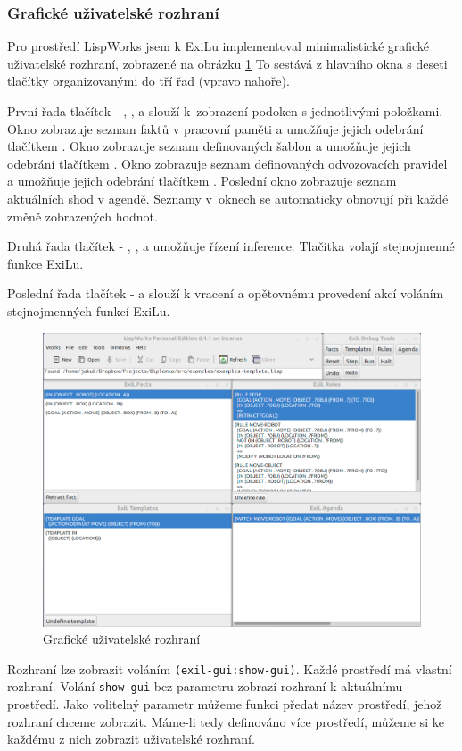 \subsubsection{Grafické uživatelské rozhraní}

Pro prostředí LispWorks jsem k ExiLu implementoval minimalistické grafické
uživatelské rozhraní, zobrazené na obrázku \ref{gui} To sestává z hlavního okna
s deseti tlačítky organizovanými do tří řad (vpravo nahoře).

První řada tlačítek - , ,  a 
slouží k~zobrazení podoken s jednotlivými položkami. Okno  zobrazuje
seznam faktů v pracovní paměti a umožňuje jejich odebrání tlačítkem
. Okno  zobrazuje seznam definovaných šablon a
umožňuje jejich odebrání tlačítkem . Okno 
zobrazuje seznam definovaných odvozovacích pravidel a umožňuje jejich odebrání
tlačítkem . Poslední okno  zobrazuje seznam
aktuálních shod v agendě. Seznamy v~oknech se automaticky obnovují při každé
změně zobrazených hodnot.

Druhá řada tlačítek - , ,  a  umožňuje
řízení inference. Tlačítka volají stejnojmenné funkce ExiLu.

Poslední řada tlačítek -  a  slouží k vracení a opětovnému
provedení akcí voláním stejnojmenných funkcí ExiLu.

\begin{figure}[h]
\includegraphics[width=\textwidth]{exil-gui.png}
\caption{Grafické uživatelské rozhraní}
\label{gui}
\end{figure}

Rozhraní lze zobrazit voláním \verb|(exil-gui:show-gui)|. Každé prostředí má
vlastní rozhraní. Volání \verb|show-gui| bez parametru zobrazí rozhraní k
aktuálnímu prostředí. Jako volitelný parametr můžeme funkci předat název
prostředí, jehož rozhraní chceme zobrazit. Máme-li tedy definováno více
prostředí, můžeme si ke každému z nich zobrazit uživatelské rozhraní.
